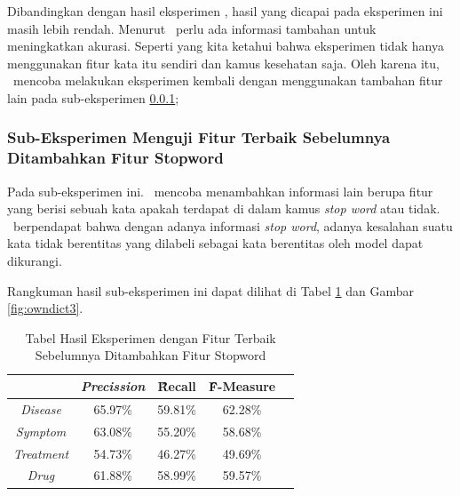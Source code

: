 	Dibandingkan dengan hasil eksperimen \cite{skripsiKakRadit}, hasil yang dicapai pada eksperimen ini masih lebih rendah. Menurut \saya~perlu ada informasi tambahan untuk meningkatkan akurasi. Seperti yang kita ketahui bahwa eksperimen \cite{skripsiKakRadit} tidak hanya menggunakan fitur kata itu sendiri dan kamus kesehatan saja. Oleh karena itu, \saya~mencoba melakukan eksperimen kembali dengan menggunakan tambahan fitur lain pada sub-eksperimen \ref{eks:subekstopword};
	
	\subsubsection{Sub-Eksperimen Menguji Fitur Terbaik Sebelumnya Ditambahkan Fitur Stopword}\label{eks:subekstopword}
	Pada sub-eksperimen ini. \saya~mencoba menambahkan informasi lain berupa fitur yang berisi sebuah kata apakah terdapat di dalam kamus \textit{stop word} atau tidak. \Saya~berpendapat bahwa dengan adanya informasi \textit{stop word}, adanya kesalahan suatu kata tidak berentitas yang dilabeli sebagai kata berentitas oleh model dapat dikurangi.
	
	Rangkuman hasil sub-eksperimen ini dapat dilihat di Tabel \ref{table:owndict3} dan Gambar \ref{fig:owndict3}.
	
	\begin{table}
		\centering
		\caption{Tabel Hasil Eksperimen dengan Fitur Terbaik Sebelumnya Ditambahkan Fitur Stopword}
		\begin{tabular}{|c|c|c|c|c|}
			\hline
							      & \textit{Precission} & \f{\f{Recall}} & \f{\f{F-Measure}} \\ \hline
			\textit{Disease}      & 65.97\%             & 59.81\%        & 62.28\%           \\ \hline
			\textit{Symptom}      & 63.08\%             & 55.20\%        & 58.68\%           \\ \hline
			\textit{Treatment}    & 54.73\%             & 46.27\%        & 49.69\%           \\ \hline
			\textit{Drug}		  & 61.88\%             & 58.99\%        & 59.57\%           \\ \hline
		\end{tabular}
		\label{table:owndict3}
	\end{table}
		
